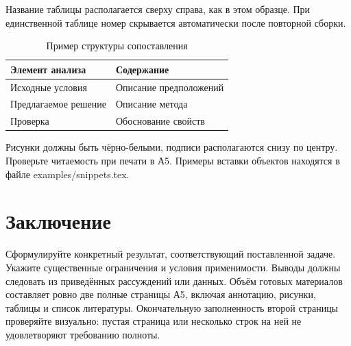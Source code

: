 Название таблицы располагается сверху справа, как в этом образце.
При единственной таблице номер скрывается автоматически после повторной сборки.
\begin{table}[htbp]
  \caption{Пример структуры сопоставления}
  \label{tab:example}
  \centering
  \begin{tabular*}{\linewidth}{@{\extracolsep{\fill}}ll@{}}
    \toprule
    Элемент анализа & Содержание \\
    \midrule
    Исходные условия & Описание предположений \\
    Предлагаемое решение & Описание метода \\
    Проверка & Обоснование свойств \\
    \bottomrule
  \end{tabular*}
\end{table}

Рисунки должны быть чёрно-белыми, подписи располагаются снизу по центру.
Проверьте читаемость при печати в А5. Примеры вставки объектов находятся
в файле \textnormal{examples/snippets.tex}.

\section{Заключение}
Сформулируйте конкретный результат, соответствующий поставленной задаче.
Укажите существенные ограничения и условия применимости. Выводы должны следовать
из приведённых рассуждений или данных. Объём готовых материалов составляет ровно
две полные страницы А5, включая аннотацию, рисунки, таблицы и список литературы.
Окончательную заполненность второй страницы проверяйте визуально: пустая страница
или несколько строк на ней не удовлетворяют требованию полноты.
